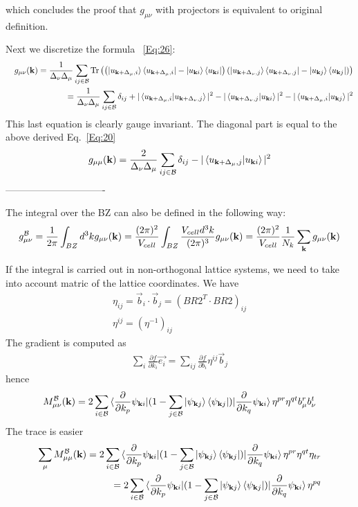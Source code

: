 \documentclass[onecolumn, prb,preprintnumbers,amsmath,amssymb,floatfix]{revtex4}
\newcommand{\vk}{{\mathbf{k}}}
\newcommand{\Tr}{\mathrm{Tr}} \newcommand{\npsi}{\underline{\psi}}
\newcommand{\cb}{{\cal B}}
\begin{document}
which concludes the proof that $g_{\mu\nu}$ with projectors is
equivalent to original definition.

Next we discretize the formula ~\ref{Eq:26}:
\begin{eqnarray}
&&g_{\mu\nu}(\vk)  =  \frac{1}{\Delta_\nu\Delta_\mu}\sum_{i j \in\cb}\Tr\left(
  \left(\ket{u_{\vk+\Delta_\mu, i}}\bra{u_{\vk+\Delta_\mu, i}}-\ket{u_{\vk i}}\bra{u_{\vk i}}\right)
  \left(\ket{u_{\vk+\Delta_\nu,j}}\bra{u_{\vk+\Delta_\nu,j}} -\ket{u_{\vk j}}\bra{u_{\vk j}}\right)
  \right)\\
  &&=  \frac{1}{\Delta_\nu\Delta_\mu}\sum_{i j \in\cb}
     \delta_{ij}+
    |\braket{u_{\vk+\Delta_\mu, i}|u_{\vk+\Delta_\nu,j}}|^2
   -|\braket{u_{\vk+\Delta_\nu,j}|u_{\vk i}}|^2 
   -|\braket{u_{\vk+\Delta_\mu, i}|u_{\vk j}}|^2
\end{eqnarray}
This last equation is clearly gauge invariant. The diagonal part is
equal to the above derived Eq.~\ref{Eq:20}
\begin{eqnarray}
  g_{\mu\mu}(\vk)  =\frac{2}{\Delta_\nu\Delta_\mu}\sum_{i j \in\cb}
\delta_{ij}-|\braket{u_{\vk+\Delta_\mu,j}|u_{\vk i}}|^2 
\end{eqnarray}  
-------------------------------

The integral over the BZ can also be defined in the following way:
\begin{eqnarray}
  g_{\mu\nu}^\cb=\frac{1}{2\pi}\int_{BZ} d^3k g_{\mu\nu}(\vk)  =
  \frac{(2\pi)^2}{V_{cell}} \int_{BZ}\frac{V_{cell} d^3k}{(2\pi)^3} g_{\mu\nu}(\vk) 
=\frac{(2\pi)^2}{V_{cell}} \frac{1}{N_k} \sum_{\vk}g_{\mu\nu}(\vk) 
\end{eqnarray}  


If the integral is carried out in non-orthogonal lattice systems, we need to take into account matric of the lattice coordinates. We have
\begin{eqnarray}
  \eta_{ij}=\vec{b}_i \cdot \vec{b}_j = (BR2^T\cdot BR2)_{ij}\\
  \eta^{ij} = \left(\eta^{-1}\right)_{ij}
\end{eqnarray}
The gradient is computed as
\begin{eqnarray}
\sum_i \frac{\partial f}{\partial k_i} \vec{e_i}= \sum_{ij}\frac{\partial f}{\partial b_i}\eta^{ij} \vec{b}_j  
\end{eqnarray}
hence
\begin{eqnarray}
 M_{\mu\nu}^{\cb}(\vk)  =2\sum_{i\in \cb}
   \braket{\frac{\partial}{\partial k_{p}}\psi_{\vk i}|(1-\sum_{j\in \cb}\ket{\psi_{\vk j}}\bra{\psi_{\vk j}})|\frac{\partial}{\partial k_{q}}\psi_{\vk i}}\eta^{p r}\eta^{q t} b^{r}_{\mu} b^t_{\nu}
\end{eqnarray}
The trace is easier
\begin{eqnarray}
 \sum_{\mu}M_{\mu\mu}^{\cb}(\vk)  =2\sum_{i\in \cb}
   \braket{\frac{\partial}{\partial k_{p}}\psi_{\vk i}|(1-\sum_{j\in \cb}\ket{\psi_{\vk j}}\bra{\psi_{\vk j}})|\frac{\partial}{\partial k_{q}}\psi_{\vk i}}\eta^{p r}\eta^{q t} \eta_{t r}\\
=2\sum_{i\in \cb}
   \braket{\frac{\partial}{\partial k_{p}}\psi_{\vk i}|(1-\sum_{j\in \cb}\ket{\psi_{\vk j}}\bra{\psi_{\vk j}})|\frac{\partial}{\partial k_{q}}\psi_{\vk i}}\eta^{p q}
\end{eqnarray}
\end{document}
